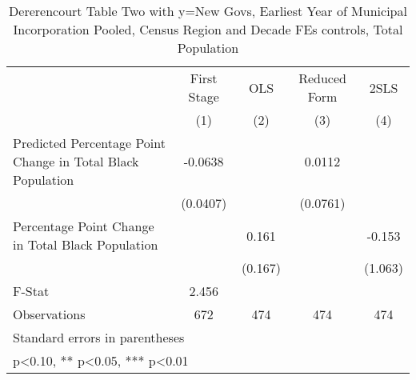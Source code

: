 \begin{table}[htbp]\centering
\def\sym#1{\ifmmode^{#1}\else\(^{#1}\)\fi}
\caption{Dererencourt Table Two with y=New Govs, Earliest Year of Municipal Incorporation  Pooled, Census Region and Decade FEs controls, Total Population}
\begin{tabular}{l*{4}{c}}
\toprule
                    & First Stage   &         OLS   &Reduced Form   &        2SLS   \\
                    &\multicolumn{1}{c}{(1)}   &\multicolumn{1}{c}{(2)}   &\multicolumn{1}{c}{(3)}   &\multicolumn{1}{c}{(4)}   \\
\midrule
Predicted Percentage Point Change in Total Black Population&     -0.0638   &               &      0.0112   &               \\
                    &    (0.0407)   &               &    (0.0761)   &               \\
\addlinespace
Percentage Point Change in Total Black Population&               &       0.161   &               &      -0.153   \\
                    &               &     (0.167)   &               &     (1.063)   \\
\midrule
F-Stat              &       2.456   &               &               &               \\
Observations        &         672   &         474   &         474   &         474   \\
\bottomrule
\multicolumn{5}{l}{\footnotesize Standard errors in parentheses}\\
\multicolumn{5}{l}{\footnotesize * p<0.10, ** p<0.05, *** p<0.01}\\
\end{tabular}
\end{table}
